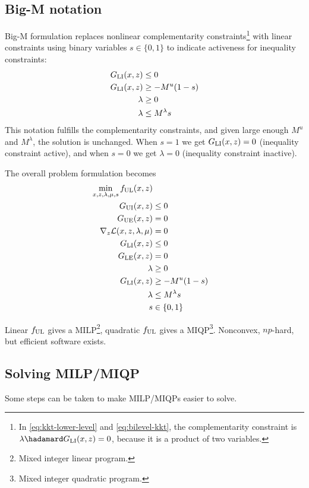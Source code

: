 \subsection{Big-M notation}
Big-M formulation replaces nonlinear complementarity constraints\footnote{In \eqref{eq:kkt-lower-level} and \eqref{eq:bilevel-kkt}, the complementarity constraint is $\lambda \hadamard G\sub{LI}(x,z) = 0$, because it is a product of two variables.} with linear constraints using binary variables $s \in \{0,1\}$ to indicate activeness for inequality constraints:
%
\begin{equation}\label{eq:big-M}
  \begin{split}
    G_\mathrm{LI}(x,z) &\leq 0 \\
    G_\mathrm{LI}(x,z) &\geq -M^u(1-s) \\
    \lambda        &\geq 0 \\
    \lambda        &\leq M^\lambda s
  \end{split}
\end{equation}
%
This notation fulfills the complementarity constraints, and given large enough $M^u$ and $M^\lambda$, the solution is unchanged. When $s = 1$ we get $G_\mathrm{LI}(x,z) = 0$ (inequality constraint active), and when $s = 0$ we get $\lambda = 0$ (inequality constraint inactive).

The overall problem formulation becomes
%
\begin{equation}
  \begin{split}
    \min_{x,z,\lambda,\mu,s} f_\mathrm{UL}(x,z) \\
    G_\mathrm{UI}(x,z) & \leq 0 \\
    G_\mathrm{UE}(x,z) &= 0 \\
    \nabla_z \mathcal{L}(x,z,\lambda,\mu) &= 0 \\
    G_\mathrm{LI}(x,z) &\leq 0 \\
    G_\mathrm{LE}(x,z) &= 0 \\
    \lambda &\geq 0 \\
    G_\mathrm{LI}(x,z) &\geq -M^u(1-s) \\
    \lambda &\leq M^\lambda s \\
    s &\in \{0,1\}
  \end{split}
\end{equation}

Linear $f_\mathrm{UL}$ gives a MILP\footnote{Mixed integer linear program.}, quadratic $f_\mathrm{UL}$ gives a MIQP\footnote{Mixed integer quadratic program.}. Nonconvex, $np$-hard, but efficient software exists.

\subsection{Solving MILP/MIQP}
Some steps can be taken to make MILP/MIQPs easier to solve.

